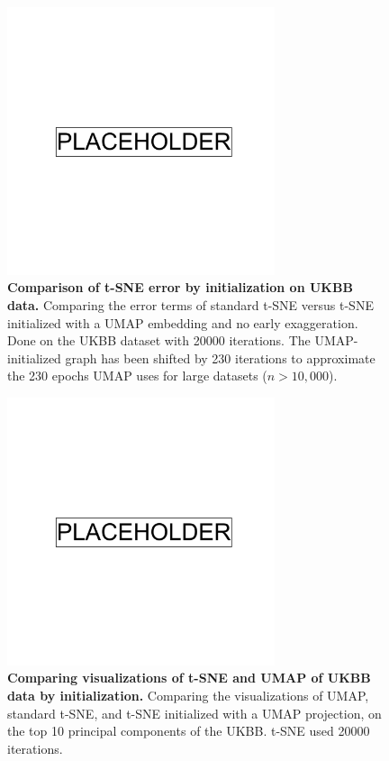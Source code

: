 \begin{figure}[!htb]
    \centering
    \includegraphics[width=0.7\textwidth]{placeholder.png}
    \caption[Comparison of t-SNE error by initialization on UKBB data]{\textbf{Comparison of t-SNE error by initialization on UKBB data.} Comparing the error terms of standard t-SNE versus t-SNE initialized with a UMAP embedding and no early exaggeration. Done on the UKBB dataset with 20000 iterations. The UMAP-initialized graph has been shifted by 230 iterations to approximate the 230 epochs UMAP uses for large datasets ($n>10,000$).}
    \label{fig:supp_tsne_umap_compare_ukbb_graph}
\end{figure}

\newpage

\begin{figure}[!htb]
    \centering
    \includegraphics[width=0.7\textwidth]{placeholder.png}
    \caption[Comparing visualizations of t-SNE and UMAP of UKBB data by initialization]{\textbf{Comparing visualizations of t-SNE and UMAP of UKBB data by initialization.} Comparing the visualizations of UMAP, standard t-SNE, and t-SNE initialized with a UMAP projection, on the top 10 principal components of the UKBB. t-SNE used 20000 iterations.}
    \label{fig:supp_tsne_umap_compare_ukbb}
\end{figure}

